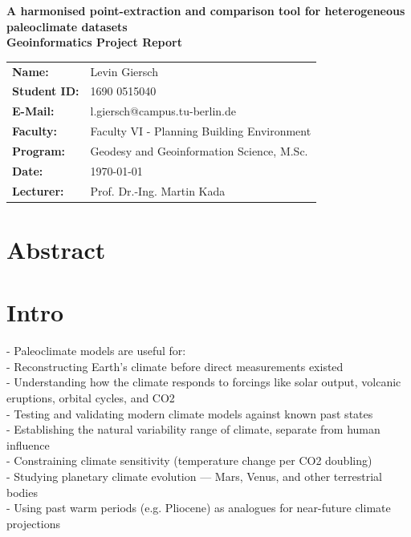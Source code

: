 \documentclass[12pt]{scrartcl}
\begin{document}
\begin{titlepage}
	\centering
	
	\noindent
	\textbf{\huge A harmonised point-extraction and comparison tool for heterogeneous paleoclimate datasets}\\
	\vspace{2cm}
	\textbf{\large Geoinformatics Project Report}\\
	\vspace{8cm}
	\begin{tabular}{ll}
		\textbf{Name:} & Levin Giersch \\
		\textbf{Student ID:} & 1690 0515040 \\
		\textbf{E-Mail:} & l.giersch@campus.tu-berlin.de\\
		\textbf{Faculty:} & Faculty VI - Planning Building Environment\\
		\textbf{Program:} & Geodesy and Geoinformation Science, M.Sc. \\
		\textbf{Date:} & \today \\
		\textbf{Lecturer:} & Prof. Dr.-Ing. Martin Kada
	\end{tabular}
	
	\newpage
	\tableofcontents
	\thispagestyle{empty}
	
\end{titlepage}



\setcounter{page}{1}
\section*{Abstract}

\begin{abstract}

\end{abstract}


\section{Intro}
- Paleoclimate models are useful for:\\
	- Reconstructing Earth's climate before direct measurements existed\\
	- Understanding how the climate responds to forcings like solar output, volcanic eruptions, orbital cycles, and CO2\\
	- Testing and validating modern climate models against known past states\\
	- Establishing the natural variability range of climate, separate from human influence\\
	- Constraining climate sensitivity (temperature change per CO2 doubling)\\
	- Studying planetary climate evolution — Mars, Venus, and other terrestrial bodies\\
	- Using past warm periods (e.g. Pliocene) as analogues for near-future climate projections\\
\end{document}

